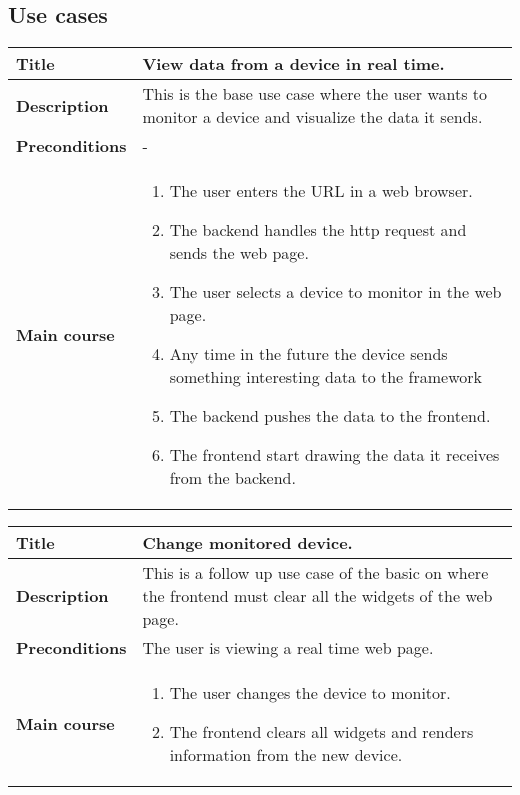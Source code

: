\documentclass[12pt]{article}
\begin{document}
        \subsection{Use cases}
            \setlength{\parindent}{0cm}
            \begin{tabularx}{\textwidth}{|l|X|}
                \hline
                \textbf{Title} & View data from a device in real time.\\
                \hline
                \textbf{Description} & This is the base use case where the user
                wants to monitor a device and visualize the data it sends.\\
                \hline
                \textbf{Preconditions} & - \\
                \hline
                \textbf{Main course} &
                    \begin{enumerate}
                        \item The user enters the URL in a web browser.
                        \item The backend handles the http request and sends the
                              web page.
                        \item The user selects a device to monitor in the web
                              page.
                        \item Any time in the future the device sends something
                              interesting data to the framework
                        \item The backend pushes the data to the frontend.
                        \item The frontend start drawing the data it receives
                              from the backend.
                    \end{enumerate}\\
                \hline
            \end{tabularx}

            \begin{tabularx}{\textwidth}{|l|X|}
                \hline
                \textbf{Title} & Change monitored device.\\
                \hline
                \textbf{Description} & This is a follow up use case of the basic
                on where the frontend must clear all the widgets of the web
                page. \\
                \hline
                \textbf{Preconditions} & The user is viewing a real time web
                page.\\
                \hline
                \textbf{Main course} &
                    \begin{enumerate}
                        \item The user changes the device to monitor.
                        \item The frontend clears all widgets and renders
                              information from the new device.
                    \end{enumerate}\\
                \hline
            \end{tabularx}
\end{document}
